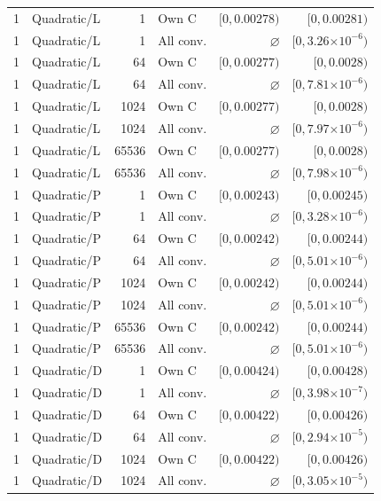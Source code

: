 \begin{longtable}{llrlrr}
1 & Quadratic/L & 1 & Own C & $[0, 0.00278)$ & $[0, 0.00281)$ \\
1 & Quadratic/L & 1 & All conv. & $\varnothing$ & $[0, 3.26\mathord{\times}10^{-6})$ \\
1 & Quadratic/L & 64 & Own C & $[0, 0.00277)$ & $[0, 0.0028)$ \\
1 & Quadratic/L & 64 & All conv. & $\varnothing$ & $[0, 7.81\mathord{\times}10^{-6})$ \\
1 & Quadratic/L & 1024 & Own C & $[0, 0.00277)$ & $[0, 0.0028)$ \\
1 & Quadratic/L & 1024 & All conv. & $\varnothing$ & $[0, 7.97\mathord{\times}10^{-6})$ \\
1 & Quadratic/L & 65536 & Own C & $[0, 0.00277)$ & $[0, 0.0028)$ \\
1 & Quadratic/L & 65536 & All conv. & $\varnothing$ & $[0, 7.98\mathord{\times}10^{-6})$ \\
1 & Quadratic/P & 1 & Own C & $[0, 0.00243)$ & $[0, 0.00245)$ \\
1 & Quadratic/P & 1 & All conv. & $\varnothing$ & $[0, 3.28\mathord{\times}10^{-6})$ \\
1 & Quadratic/P & 64 & Own C & $[0, 0.00242)$ & $[0, 0.00244)$ \\
1 & Quadratic/P & 64 & All conv. & $\varnothing$ & $[0, 5.01\mathord{\times}10^{-6})$ \\
1 & Quadratic/P & 1024 & Own C & $[0, 0.00242)$ & $[0, 0.00244)$ \\
1 & Quadratic/P & 1024 & All conv. & $\varnothing$ & $[0, 5.01\mathord{\times}10^{-6})$ \\
1 & Quadratic/P & 65536 & Own C & $[0, 0.00242)$ & $[0, 0.00244)$ \\
1 & Quadratic/P & 65536 & All conv. & $\varnothing$ & $[0, 5.01\mathord{\times}10^{-6})$ \\
1 & Quadratic/D & 1 & Own C & $[0, 0.00424)$ & $[0, 0.00428)$ \\
1 & Quadratic/D & 1 & All conv. & $\varnothing$ & $[0, 3.98\mathord{\times}10^{-7})$ \\
1 & Quadratic/D & 64 & Own C & $[0, 0.00422)$ & $[0, 0.00426)$ \\
1 & Quadratic/D & 64 & All conv. & $\varnothing$ & $[0, 2.94\mathord{\times}10^{-5})$ \\
1 & Quadratic/D & 1024 & Own C & $[0, 0.00422)$ & $[0, 0.00426)$ \\
1 & Quadratic/D & 1024 & All conv. & $\varnothing$ & $[0, 3.05\mathord{\times}10^{-5})$ \\

\end{longtable}
